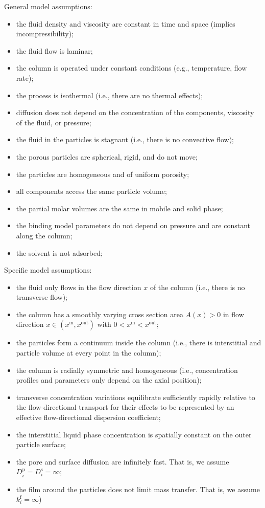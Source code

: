 \documentclass{article}
\begin{document}
General model assumptions:
\begin{itemize}
    \item the fluid density and viscosity are constant in time and space (implies incompressibility);
    \item the fluid flow is laminar;
    \item the column is operated under constant conditions (e.g., temperature, flow rate);
    \item the process is isothermal (i.e., there are no thermal effects);
    \item diffusion does not depend on the concentration of the components, viscosity of the fluid, or pressure;
    \item the fluid in the particles is stagnant (i.e., there is no convective flow);
    \item the porous particles are spherical, rigid, and do not move;
    \item the particles are homogeneous and of uniform porosity;
    \item all components access the same particle volume;
    \item the partial molar volumes are the same in mobile and solid phase;
    \item the binding model parameters do not depend on pressure and are constant along the column;
    \item the solvent is not adsorbed;
\end{itemize}

Specific model assumptions:
\begin{itemize}
    \item the fluid only flows in the flow direction $x$ of the column (i.e., there is no transverse flow);
    \item the column has a smoothly varying cross section area $A(x) > 0$ in flow direction $x \in (x^{\mathrm{in}}, x^{\mathrm{out}})$ with $0 < x^{\mathrm{in}} < x^{\mathrm{out}}$;
    \item the particles form a continuum inside the column (i.e., there is interstitial and particle volume at every point in the column);
    \item the column is radially symmetric and homogeneous (i.e., concentration profiles and parameters only depend on the axial position);
    \item transverse concentration variations equilibrate sufficiently rapidly relative to the flow-directional transport for their effects to be represented by an effective flow-directional dispersion coefficient;
    \item the interstitial liquid phase concentration is spatially constant on the outer particle surface;
    \item the pore and surface diffusion are infinitely fast. That is, we assume $D^{\mathrm{p}}_{i} = D^{\mathrm{s}}_{i} = \infty$;
    \item the film around the particles does not limit mass transfer. That is, we assume $k^{\mathrm{f}}_{i} = \infty$)
\end{itemize}
\end{document}
